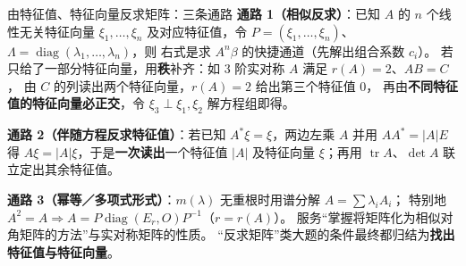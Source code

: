 \begin{fdeep}{由特征值、特征向量反求矩阵：三条通路}
\textbf{通路 1（相似反求）}：已知 $A$ 的 $n$ 个线性无关特征向量 $\xi_1,\dots,\xi_n$
及对应特征值，令 $P=(\xi_1,\dots,\xi_n)$、$\Lambda=\operatorname{diag}(\lambda_1,\dots,\lambda_n)$，则
右式是求 $A^{n}\beta$ 的快捷通道（先解出组合系数 $c_i$）。
若只给了一部分特征向量，用\textbf{秩}补齐：如 $3$ 阶实对称 $A$ 满足 $r(A)=2$、$AB=C$，
由 $C$ 的列读出两个特征向量，$r(A)=2$ 给出第三个特征值 $0$，
再由\textbf{不同特征值的特征向量必正交}，令 $\xi_3\perp\xi_1,\xi_2$ 解方程组即得。

\textbf{通路 2（伴随方程反求特征值）}：若已知 $A^{*}\xi=\xi$，两边左乘 $A$ 并用
$AA^{*}=\lvert A\rvert E$ 得 $A\xi=\lvert A\rvert\xi$，于是\textbf{一次读出}一个特征值 $\lvert A\rvert$
及特征向量 $\xi$；再用 $\operatorname{tr}A$、$\det A$ 联立定出其余特征值。

\textbf{通路 3（幂等／多项式形式）}：$m(\lambda)$ 无重根时用谱分解 $A=\sum\lambda_iA_i$；
特别地 $A^{2}=A\Rightarrow A=P\operatorname{diag}(E_r,O)P^{-1}$（$r=r(A)$）。
\fbref{}服务“掌握将矩阵化为相似对角矩阵的方法”与实对称矩阵的性质。
“反求矩阵”类大题的条件最终都归结为\textbf{找出特征值与特征向量}。
\end{fdeep}

